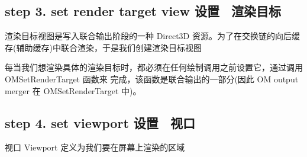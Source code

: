 \documentclass[UTF8,a4paper,8pt]{ctexart}
\begin{document}
 \subsection*{step 3. set render target view                 设置 \ 渲染目标}渲染目标视图是写入联合输出阶段的一种 Direct3D 资源。为了在交换链的向后缓存(辅助缓存)中联合渲染，于是我们创建渲染目标视图
 
 每当我们想渲染具体的渲染目标时，都必须在任何绘制调用之前设置它，通过调用 OMSetRenderTarget 函数来
 完成，该函数是联合输出的一部分(因此 OM output merger 在 OMSetRenderTarget 中)。
\newpage  
 \subsection*{step 4. set viewport                           设置 \ 视口}视口 Viewport 定义为我们要在屏幕上渲染的区域
		     
\end{document}
